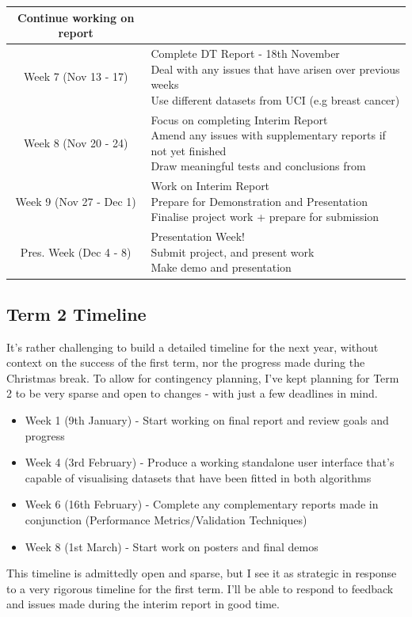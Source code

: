 \documentclass[report,10pt]{article}
\begin{document}
\begin{tabular}{|c|p{10cm}|}
{Continue working on report} \\
\hline
Week 7 (Nov 13 - 17) & 
\makecell[l]{Complete DT Report - 18th November \\
Deal with any issues that have arisen over previous weeks \\
Use different datasets from UCI (e.g breast cancer)} \\
\hline
Week 8 (Nov 20 - 24) & 
\makecell[l]{ Focus on completing Interim Report \\
Amend any issues with supplementary reports if not yet finished \\
Draw meaningful tests and conclusions from } \\
\hline
Week 9 (Nov 27 - Dec 1) & 
\makecell[l]{Work on Interim Report \\
Prepare for Demonstration and Presentation \\
Finalise project work + prepare for submission} \\
\hline
Pres. Week (Dec 4 - 8) & 
\makecell[l]{Presentation Week!\\
Submit project, and present work \\
Make demo and presentation} \\
\hline
\end{tabular}

\subsection{Term 2 Timeline}
It's rather challenging to build a detailed timeline for the next year, without context on the success of the first term, nor the progress made during the Christmas break. To allow for contingency planning, I've kept planning for Term 2 to be very sparse and open to changes - with just a few deadlines in mind.
\begin{itemize}
    \item Week 1 (9th January) - Start working on final report and review goals and progress
    \item Week 4 (3rd February) - Produce a working standalone user interface that's capable of visualising datasets that have been fitted in both algorithms
    \item Week 6 (16th February) - Complete any complementary reports made in conjunction (Performance Metrics/Validation Techniques)
    \item Week 8 (1st March) - Start work on posters and final demos
\end{itemize}
This timeline is admittedly open and sparse, but I see it as strategic in response to a very rigorous timeline for the first term. I'll be able to respond to feedback and issues made during the interim report in good time.
\end{document}
